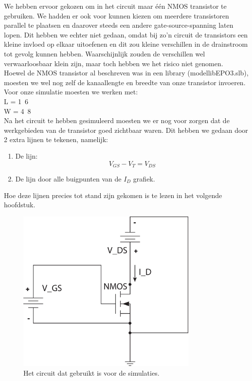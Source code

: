 \documentclass{scrartcl}  %
\begin{document}
We hebben ervoor gekozen om in het circuit maar één NMOS transistor te gebruiken. 
We hadden er ook voor kunnen kiezen om meerdere transistoren parallel te plaatsen en daarover steeds een andere gate-source-spanning laten lopen. 
Dit hebben we echter niet gedaan, omdat bij zo'n circuit de transistors een kleine invloed op elkaar uitoefenen en dit zou kleine verschillen in de drainstroom tot gevolg kunnen hebben. 
Waarschijnlijk zouden de verschillen wel verwaarloosbaar klein zijn, maar toch hebben we het risico niet genomen. 
\\
Hoewel de NMOS transistor al beschreven was in een library (modellibEPO3.slb), moesten we wel nog zelf de kanaallengte en breedte van onze transistor invoeren. 
Voor onze simulatie moesten we werken met: \\
L = \unit{1.6}{\micro\meter} \\
W = \unit{4.8}{\micro\meter} \\
Na het circuit te hebben gesimuleerd moesten we er nog voor zorgen dat de werkgebieden van de transistor goed zichtbaar waren. 
Dit hebben we gedaan door 2 extra lijnen te tekenen, namelijk: 
\begin{enumerate}
	\item De lijn: 
\begin{equation}
V_{GS} - V_{T} = V_{DS} 
\end{equation}
	\item De lijn door alle buigpunten van de $I_{D}$ grafiek.
\end{enumerate}
Hoe deze lijnen precies tot stand zijn gekomen is te lezen in het volgende hoofdstuk. 


\begin{figure}[H]
\centering
	\includegraphics[width=0.8\textwidth]{resources/NMOS_circuit}
	\caption{Het circuit dat gebruikt is voor de simulaties.}
	\label{fig:circuit}
\end{figure}
\end{document}
